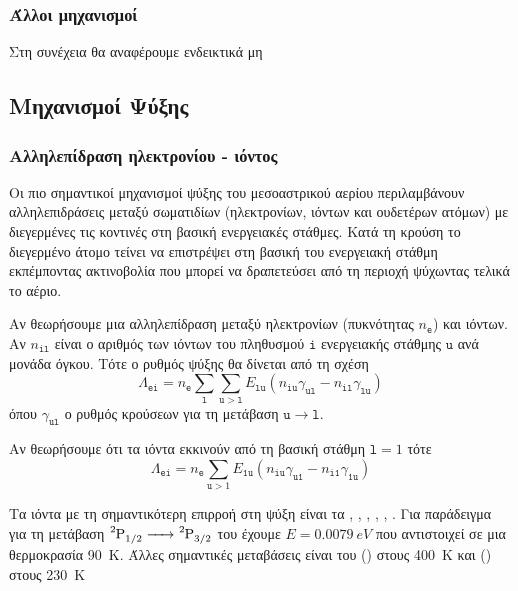  
\subsubsection{Άλλοι μηχανισμοί}
Στη συνέχεια θα αναφέρουμε ενδεικτικά μη
 
 
\subsection{Μηχανισμοί Ψύξης}
\subsubsection{Αλληλεπίδραση ηλεκτρονίου - ιόντος}
Οι πιο σημαντικοί μηχανισμοί ψύξης του μεσοαστρικού αερίου περιλαμβάνουν αλληλεπιδράσεις μεταξύ σωματιδίων (ηλεκτρονίων, ιόντων και ουδετέρων ατόμων) με διεγερμένες τις κοντινές στη βασική ενεργειακές στάθμες. Κατά τη κρούση το διεγερμένο άτομο τείνει να επιστρέψει στη βασική του ενεργειακή στάθμη εκπέμποντας ακτινοβολία που μπορεί να δραπετεύσει από τη περιοχή ψύχωντας τελικά το αέριο. 

Αν θεωρήσουμε μια αλληλεπίδραση μεταξύ ηλεκτρονίων (πυκνότητας $n_\mathtt{e}$) και ιόντων. Αν $n_\mathtt{il}$ είναι ο αριθμός των ιόντων του πληθυσμού $\mathtt{i}$ ενεργειακής στάθμης $\mathtt{u}$ ανά μονάδα όγκου. Τότε ο ρυθμός ψύξης θα δίνεται από τη σχέση
\begin{equation}
\Lambda _\mathtt{ei} = n_\mathtt{e} \sum_{\mathtt{l}} \sum_{\mathtt{u}>\mathtt{l}} E_\mathtt{lu} 
(n_\mathtt{iu} \gamma _\mathtt{ul} - n_\mathtt{il} \gamma _\mathtt{lu}) 
\end{equation}
όπου $\gamma _\mathtt{ul}$ ο ρυθμός κρούσεων για τη μετάβαση $\mathtt{u} \rightarrow \mathtt{l}$.

Αν θεωρήσουμε ότι τα ιόντα εκκινούν από τη βασική στάθμη $\mathtt{l}=1$ τότε  
\begin{equation}
\Lambda _\mathtt{ei} = n_\mathtt{e} \sum_{\mathtt{u}>1} E_\mathtt{1u} 
(n_\mathtt{iu} \gamma _\mathtt{u1} - n_\mathtt{i1} \gamma _\mathtt{1u}) 
\end{equation}

Τα ιόντα με τη σημαντικότερη επιρροή στη ψύξη είναι τα , , , , , . Για παράδειγμα για τη μετάβαση $\ce{^2P1/2 -> ^2P3/2}$ του  έχουμε $Ε=\SI{0.0079}{eV}$ που αντιστοιχεί σε μια θερμοκρασία \SI{90}{K}. Άλλες σημαντικές μεταβάσεις είναι του  () στους \SI{400}{K} και  () στους \SI{230}{K}

